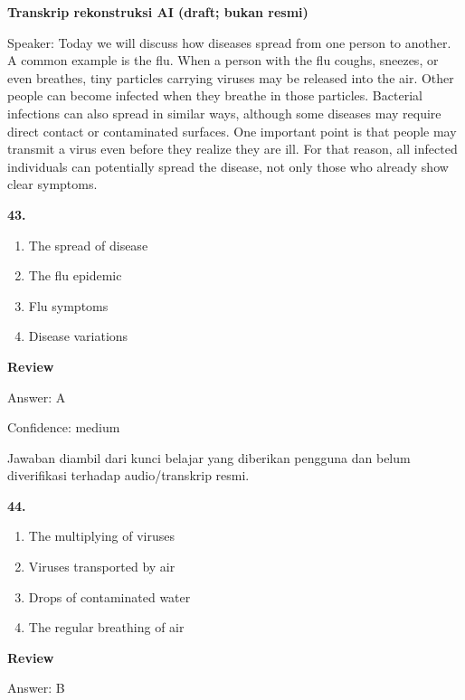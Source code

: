 \documentclass[12pt]{article}
\begin{document}
\begin{exampleblock}
\textbf{Transkrip rekonstruksi AI (draft; bukan resmi)}\par
Speaker: Today we will discuss how diseases spread from one person to another. A common example is the flu. When a person with the flu coughs, sneezes, or even breathes, tiny particles carrying viruses may be released into the air. Other people can become infected when they breathe in those particles. Bacterial infections can also spread in similar ways, although some diseases may require direct contact or contaminated surfaces. One important point is that people may transmit a virus even before they realize they are ill. For that reason, all infected individuals can potentially spread the disease, not only those who already show clear symptoms.\par
\end{exampleblock}
\noindent\textbf{43.}
\begin{enumerate}[label=(\Alph*),leftmargin=*,itemsep=0.2em]
\item The spread of disease
\item The flu epidemic
\item Flu symptoms
\item Disease variations
\end{enumerate}
\par
\begingroup
\setlength{\parskip}{0pt}
\setlength{\parindent}{0pt}
\textbf{Review}\par
Answer: A\par
Confidence: medium\par
Jawaban diambil dari kunci belajar yang diberikan pengguna dan belum diverifikasi terhadap audio/transkrip resmi.\par
\endgroup
\par
\vspace{0.25\baselineskip}
\noindent\textbf{44.}
\begin{enumerate}[label=(\Alph*),leftmargin=*,itemsep=0.2em]
\item The multiplying of viruses
\item Viruses transported by air
\item Drops of contaminated water
\item The regular breathing of air
\end{enumerate}
\par
\begingroup
\setlength{\parskip}{0pt}
\setlength{\parindent}{0pt}
\textbf{Review}\par
Answer: B\par
\end{document}
